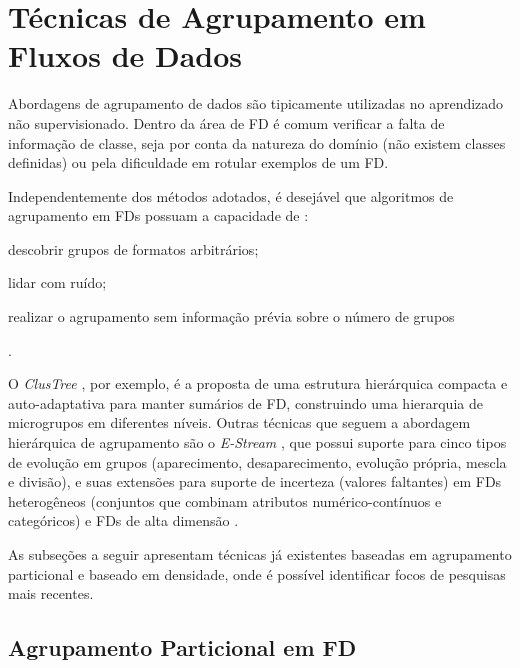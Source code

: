 \section{Técnicas de Agrupamento em Fluxos de Dados}


Abordagens de agrupamento de dados são tipicamente utilizadas no aprendizado não supervisionado. Dentro da área de FD é comum verificar a falta de informação de classe, seja por conta da natureza do domínio (não existem classes definidas) ou pela dificuldade em rotular exemplos de um FD.

Independentemente dos métodos adotados, é desejável que algoritmos de agrupamento em FDs possuam a capacidade de \cite{Amini2014}: 
\begin{enumerate*}[label=\itshape\alph*\upshape)]
\item descobrir grupos de formatos arbitrários;
\item lidar com ruído;
\item realizar o agrupamento sem informação prévia sobre o número de grupos
\end{enumerate*}.




O \emph{ClusTree} \cite{Kranen2011}, por exemplo, é a proposta de uma estrutura hierárquica compacta e auto-adaptativa para manter sumários de FD, construindo uma hierarquia de microgrupos em diferentes níveis. Outras técnicas que seguem a abordagem hierárquica de agrupamento são o \emph{E-Stream} \cite{Udommanetanakit2007}, que possui suporte para cinco tipos de evolução em grupos (aparecimento, desaparecimento, evolução própria, mescla e divisão), e suas extensões para suporte de incerteza (valores faltantes) em FDs heterogêneos (conjuntos que combinam atributos numérico-contínuos e categóricos) \cite{Meesuksabai2011} e FDs de alta dimensão \cite{Chairukwattana2014}.

As subseções a seguir apresentam técnicas já existentes baseadas em agrupamento particional e baseado em densidade, onde é possível identificar focos de pesquisas mais recentes.

\subsection{Agrupamento Particional em FD}

